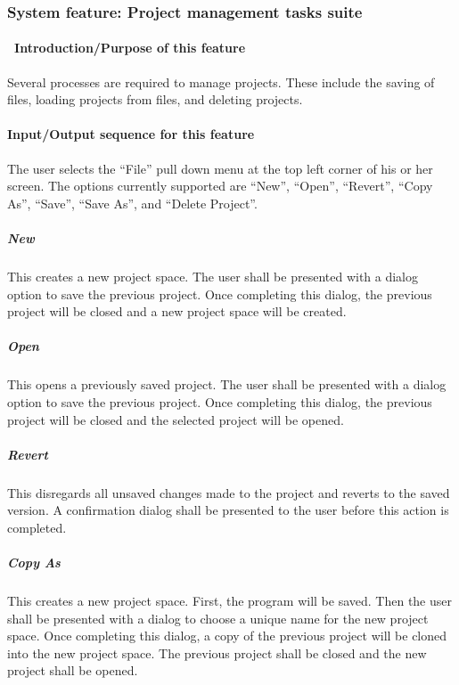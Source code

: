 \documentclass[twoside,letterpaper]{article}
\begin{document}
\clearpage






\clearpage


\subsubsection[System feature: [Project management tasks suite]{\rmfamily\bfseries System
feature: Project management tasks suite}

\paragraph[\ Introduction/Purpose of this feature]{\foreignlanguage{english}{\ }\foreignlanguage{english}{Introduction/Purpose of this feature}}
{
Several processes are required to manage projects. These include the saving of files, loading projects from files, and deleting projects.}


\paragraph[Input/Output sequence for this feature]{\rmfamily\bfseries
Input/Output sequence for this feature}
{
The user selects the ``File'' pull down menu at the top left corner of his or her screen. The options currently supported are ``New'', ``Open'', ``Revert'', ``Copy As'', ``Save'', ``Save As'', and ``Delete Project''. }

\subparagraph{New}
{
This creates a new project space. The user shall be presented with a dialog option to save the previous project. Once completing this dialog, the previous project will be closed and a new project space will be created. }

\subparagraph{Open}
{
This opens a previously saved project. The user shall be presented with a dialog option to save the previous project. Once completing this dialog, the previous project will be closed and the selected project will be opened.}

\subparagraph{Revert}
{
This disregards all unsaved changes made to the project and reverts to the saved version. A confirmation dialog shall be presented to the user before this action is completed.}

\subparagraph{Copy As}
{
This creates a new project space. First, the program will be saved. Then the user shall be presented with a dialog to choose a unique name for the new project space. Once completing this dialog, a copy of the previous project will be cloned into the new project space. The previous project shall be closed and the new project shall be opened.}
\end{document}
